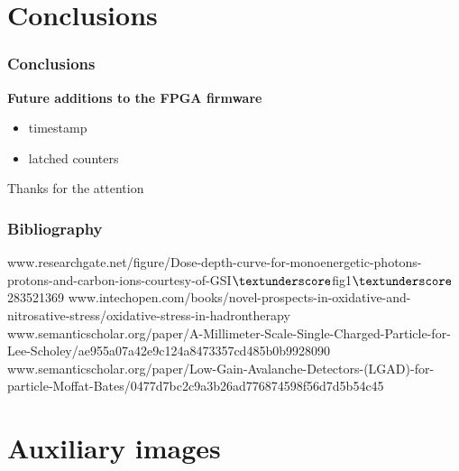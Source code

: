 \documentclass[aspectratio=169]{beamer}
\begin{document}
	\section{Conclusions}
	
	\begin{frame}
	\frametitle{Conclusions }
	\begin{center}
		\textbf{Future additions to the FPGA firmware}
	\end{center}
		\begin{itemize}
			\item timestamp
			\item latched counters
			
		\end{itemize}
		\begin{center}
			Thanks for the attention
		\end{center}
		
	\end{frame}

	\begin{frame}
	\frametitle{Bibliography}
	{\scriptsize 
	\begin{thebibliography}{00}
		www.researchgate.net/figure/Dose-depth-curve-for-monoenergetic-photons-protons-and-carbon-ions-courtesy-of-GSI$\textunderscore$fig1$\textunderscore$283521369
		\newline
		www.intechopen.com/books/novel-prospects-in-oxidative-and-nitrosative-stress/oxidative-stress-in-hadrontherapy
		\newline
		www.semanticscholar.org/paper/A-Millimeter-Scale-Single-Charged-Particle-for-Lee-Scholey/ae955a07a42e9c124a8473357cd485b0b9928090
		\newline
		www.semanticscholar.org/paper/Low-Gain-Avalanche-Detectors-(LGAD)-for-particle-Moffat-Bates/0477d7bc2c9a3b26ad776874598f56d7d5b54c45
	\end{thebibliography} }
	\end{frame}

	\section{Auxiliary images}
	
\end{document}
